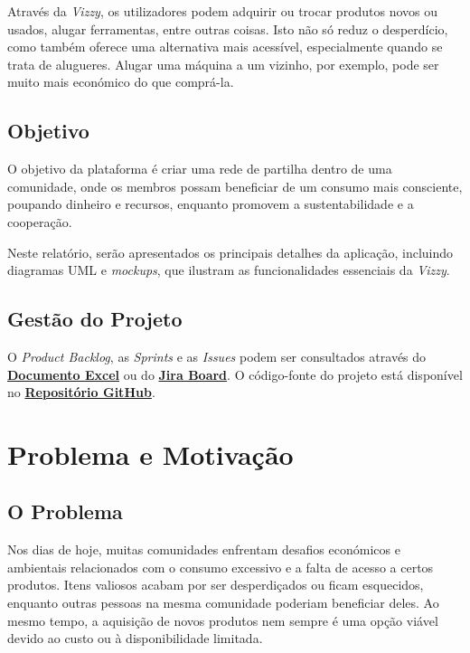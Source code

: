 \documentclass[a4paper, 12pt]{article} %
\begin{document}
Através da \textit{Vizzy}, os utilizadores podem adquirir ou trocar produtos novos ou usados, alugar ferramentas, entre outras coisas. Isto não só reduz o desperdício, como também oferece uma alternativa mais acessível, especialmente quando se trata de alugueres. Alugar uma máquina a um vizinho, por exemplo, pode ser muito mais económico do que comprá-la.

\subsection{Objetivo}
O objetivo da plataforma é criar uma rede de partilha dentro de uma comunidade, onde os membros possam beneficiar de um consumo mais consciente, poupando dinheiro e recursos, enquanto promovem a sustentabilidade e a cooperação.

Neste relatório, serão apresentados os principais detalhes da aplicação, incluindo diagramas UML e \textit{mockups}, que ilustram as funcionalidades essenciais da \textit{Vizzy}.

\subsection{Gestão do Projeto}
O \textit{Product Backlog}, as \textit{Sprints} e as \textit{Issues} podem ser consultados através do \href{https://ipcapt-my.sharepoint.com/:x:/g/personal/nfr\_ipca\_pt/Eb29k3z-aWRGisXGIZopL6IBy5l5QZjY8SjG1iWQDl6c7w?rtime=jE\_b04Za3Ug}{\textbf{Documento Excel}} ou do \href{https://basigraphics.atlassian.net/jira/software/projects/VIZZY/boards/1/backlog?epics=visible&atlOrigin=eyJpIjoiOGNmZTQ2MDRmNjQ1NDY0NDgwNDk0MDJiMGM0MDdlZWYiLCJwIjoiaiJ9}{\textbf{Jira Board}}. O código-fonte do projeto está disponível no \href{https://github.com/Basiiii/Vizzy}{\textbf{Repositório GitHub}}.


\newpage
\section{Problema e Motivação}

\subsection{O Problema}

Nos dias de hoje, muitas comunidades enfrentam desafios económicos e ambientais relacionados com o consumo excessivo e a falta de acesso a certos produtos. Itens valiosos acabam por ser desperdiçados ou ficam esquecidos, enquanto outras pessoas na mesma comunidade poderiam beneficiar deles. Ao mesmo tempo, a aquisição de novos produtos nem sempre é uma opção viável devido ao custo ou à disponibilidade limitada.
\end{document}
